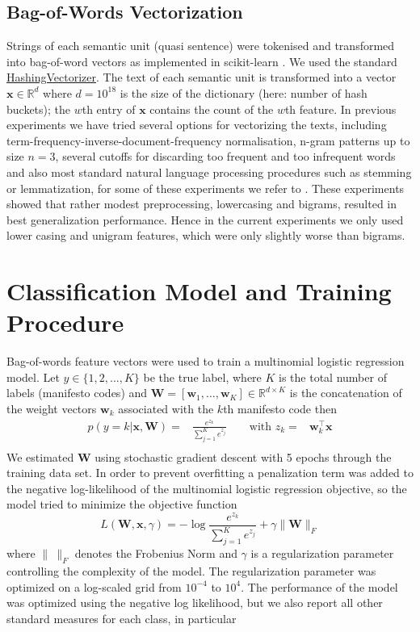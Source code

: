 \documentclass[runningheads,a4paper]{article}
\renewcommand{\vec}[1]{\mathbf{#1}}
\newcommand{\R}{\mathds{R}}
\begin{document}
\subsection{Bag-of-Words Vectorization}\label{sec:bow-vectorization}
Strings of each semantic unit (quasi sentence) were tokenised and transformed into bag-of-word vectors as implemented in scikit-learn \cite{scikit-learn}. We used the standard \href{http://scikit-learn.org/stable/modules/generated/sklearn.feature_extraction.text.HashingVectorizer.html}{HashingVectorizer}. The text of each semantic unit is transformed into a vector $\vec{x}\in\mathds{R}^d$ where $d=10^{18}$ is the size of the dictionary (here: number of hash buckets); the $w$th entry of $\vec{x}$ contains the count of the $w$th feature. In previous experiments we have tried several options for vectorizing the texts, including term-frequency-inverse-document-frequency normalisation, n-gram patterns up to size $n=3$, several cutoffs for discarding too frequent and too infrequent words and also most standard natural language processing procedures such as stemming or lemmatization, for some of these experiments we refer to \cite{Biessmann16}. These experiments showed that rather modest preprocessing, lowercasing and bigrams, resulted in best generalization performance. Hence in the current experiments we only used lower casing and unigram features, which were only slightly worse than bigrams. 

\section{Classification Model and Training Procedure}\label{sec:model}
Bag-of-words feature vectors were used to train a multinomial logistic regression model. Let $y\in\{1,2,\dots,K\}$ be the true  label, where $K$ is the total number of labels (manifesto codes) and $\vec{W}=[\vec{w}_1,\dots,\vec{w}_K]\in\R^{d\times K}$ is the concatenation of the weight vectors $\vec{w}_k$ associated with the $k$th manifesto code then 
\begin{eqnarray}\label{eq:logreg_multiclass}
p(y=k|\vec{x},\vec{W}) = &\frac{e^{z_k}}{\sum_{j=1}^K e^{z_j}} \qquad \textrm{with }  z_k=&\vec{w}_k^{\top}\vec{x} \\\nonumber
\end{eqnarray}
%
We estimated $\vec{W}$ using stochastic gradient descent with 5 epochs through the training data set. In order to prevent overfitting a penalization term was added to the negative log-likelihood of the multinomial logistic regression objective, so the model tried to minimize the objective function 
\begin{equation}\label{eq:objective}
L(\vec{W}, \vec{x}, \gamma) = - \log{\frac{e^{z_k}}{\sum_{j=1}^K e^{z_j}}}+ \gamma \| \vec{W} \|_{F}
\end{equation}
where $\|~\|_F$ denotes the Frobenius Norm and $\gamma$ is a regularization parameter controlling the complexity of the model. 
The regularization parameter was optimized on a log-scaled grid from $10^{-4}$ to $10^4$. The performance of the model was optimized using the negative log likelihood, but we also report all other standard measures for each class, in particular 
\end{document}
